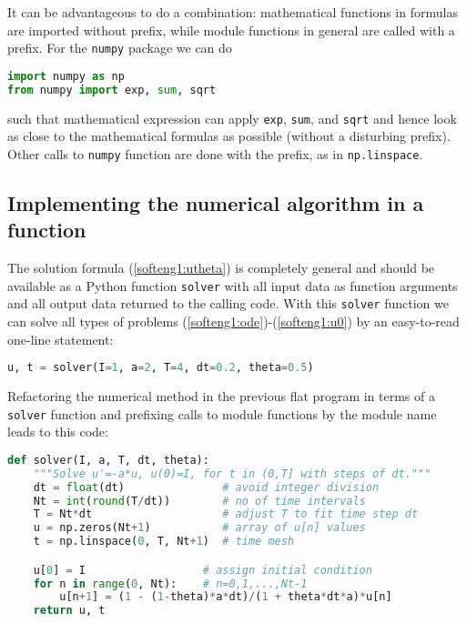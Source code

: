 \documentclass[graybox,sectrefs,envcountresetchap,open=right,final]{svmonodo}
\newenvironment{notice_mdfboxadmon}[1][]{
\begin{notice_mdfboxmdframed}[frametitle=#1]
}
{
\end{notice_mdfboxmdframed}
}
\begin{document}
\begin{notice_mdfboxadmon}
It can be advantageous to do a combination: mathematical functions
in formulas are imported without prefix, while module functions
in general are called with a prefix. For the \texttt{numpy} package we
can do

\begin{lstlisting}[language=Python,style=blue1_bluegreen]
import numpy as np
from numpy import exp, sum, sqrt
\end{lstlisting}
such that mathematical expression can apply \texttt{exp}, \texttt{sum}, and \texttt{sqrt}
and hence look as close to the mathematical formulas as possible
(without a disturbing prefix).
Other calls to \texttt{numpy} function are done with the prefix, as in
\texttt{np.linspace}.
\end{notice_mdfboxadmon}




\subsection{Implementing the numerical algorithm in a function}
\label{softeng1:basic:func}

The solution formula (\ref{softeng1:utheta}) is completely general and
should be available as a Python function \texttt{solver} with all input data as
function arguments and all output data returned to the calling code.
With this \texttt{solver} function we can solve all types of problems
(\ref{softeng1:ode})-(\ref{softeng1:u0})
by an easy-to-read one-line statement:

\begin{lstlisting}[language=Python,style=blue1_bluegreen]
u, t = solver(I=1, a=2, T=4, dt=0.2, theta=0.5)
\end{lstlisting}

Refactoring the numerical method in the previous flat program
in terms of a \texttt{solver} function and prefixing calls to
module functions by the module name leads to this code:

\begin{lstlisting}[language=Python,style=blue1_bluegreen]
def solver(I, a, T, dt, theta):
    """Solve u'=-a*u, u(0)=I, for t in (0,T] with steps of dt."""
    dt = float(dt)               # avoid integer division
    Nt = int(round(T/dt))        # no of time intervals
    T = Nt*dt                    # adjust T to fit time step dt
    u = np.zeros(Nt+1)           # array of u[n] values
    t = np.linspace(0, T, Nt+1)  # time mesh

    u[0] = I                  # assign initial condition
    for n in range(0, Nt):    # n=0,1,...,Nt-1
        u[n+1] = (1 - (1-theta)*a*dt)/(1 + theta*dt*a)*u[n]
    return u, t
\end{lstlisting}
\end{document}
